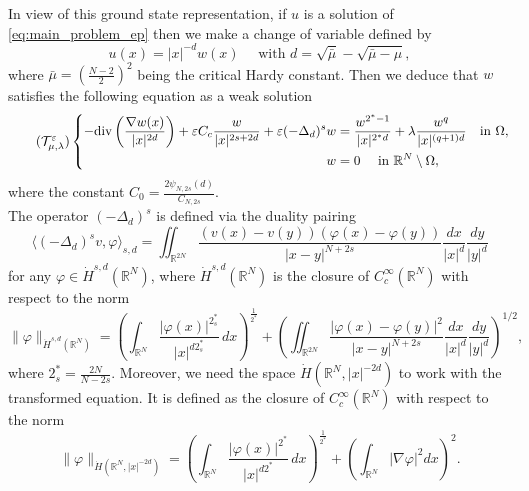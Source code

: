 \documentclass[11pt]{article}
\newcommand{\om} {\Omega}
\newcommand{\la} {\lambda}
\newcommand{\rnn}{\mathbb{R}^{N}}
\newcommand{\rtwon}{\mathbb{R}^{2N}}
\newcommand{\grad}{\nabla}
\begin{document}
In view of this ground state representation, if $u$ is a solution of \eqref{eq:main_problem_ep} then we make a change of variable defined by
\begin{equation*}
    u(x) = |x|^{-d} w(x) \quad \text{ with } d = \sqrt{\bar\mu} - \sqrt{\bar\mu - \mu},
\end{equation*}
where $\bar\mu= \left( \frac{N-2}{2} \right)^2$ being the critical Hardy constant. Then we deduce that $w$ satisfies the following equation as a weak solution
\begin{equation}\label{eq:transformed_equation}\tag{$\mathcal{T_{\mu,\la}^{\varepsilon}}$}
\left\{
\begin{aligned}
    -\mathrm{div}\left( \frac{\nabla w(x)}{|x|^{2 d}}\right) + \varepsilon C_c \frac{w}{|x|^{2s + 2d}} + \varepsilon (-\Delta_{d})^s w &= \frac{w^{2^* - 1}}{|x|^{2^* d}} + \lambda  \frac{w^q}{|x|^{(q+1) d}} \quad \text{in } \Omega,\\
    w &= 0 \quad \text{ in } \rnn \setminus \om,
\end{aligned}
\right.
\end{equation}
where the constant \( C_0 = \frac{2 \psi_{N,2s}(d)}{C_{N,2s}} \). \\
The operator \( (-\Delta_{d})^s \) is defined via the duality pairing
\begin{equation*}
    \langle (-\Delta_{d})^s v, \varphi \rangle_{s,d} = 
    \iint_{\rtwon} \frac{(v(x) - v(y))(\varphi(x) - \varphi(y))}{|x - y|^{N + 2s}}  \frac{dx}{|x|^{d}}  \frac{dy}{|y|^{d}}
\end{equation*}
for any \( \varphi \in \dot{H}^{s,d}(\mathbb{R}^N) \), where \( \dot{H}^{s,d}(\mathbb{R}^N) \) is the closure of \( C_c^\infty(\mathbb{R}^N) \) with respect to the norm
\begin{equation*}
    \|\varphi\|_{\dot{H}^{s,d}(\mathbb{R}^N)} = 
    \left( 
        \int_{\mathbb{R}^N} \frac{|\varphi(x)|^{2^*_s}}{|x|^{d 2^*_s}} \,dx 
    \right)^{\frac{1}{2^*}} 
    + 
    \left( 
        \iint_{\rtwon} \frac{|\varphi(x) - \varphi(y)|^2}{|x - y|^{N + 2s}}  \frac{dx}{|x|^{d}}  \frac{dy}{|y|^{d}} 
    \right)^{1/2},
\end{equation*}
where $2^*_s = \frac{2N}{N - 2s}$. Moreover, we need the space $ \dot{H}(\rnn,|x|^{-2d})$ to work with the transformed equation. It is defined as the closure of \( C_c^\infty(\mathbb{R}^N) \) with respect to the norm 
\begin{equation*}
    \|\varphi\|_{\dot{H}(\rnn,|x|^{-2d})} = 
    \left( 
        \int_{\mathbb{R}^N} \frac{|\varphi(x)|^{2^*}}{|x|^{d 2^*}} \,dx 
    \right)^{\frac{1}{2^*}} 
    + 
    \left( \int_{\rnn} | \grad \varphi |^2 dx \right)^2.
\end{equation*}
\end{document}
